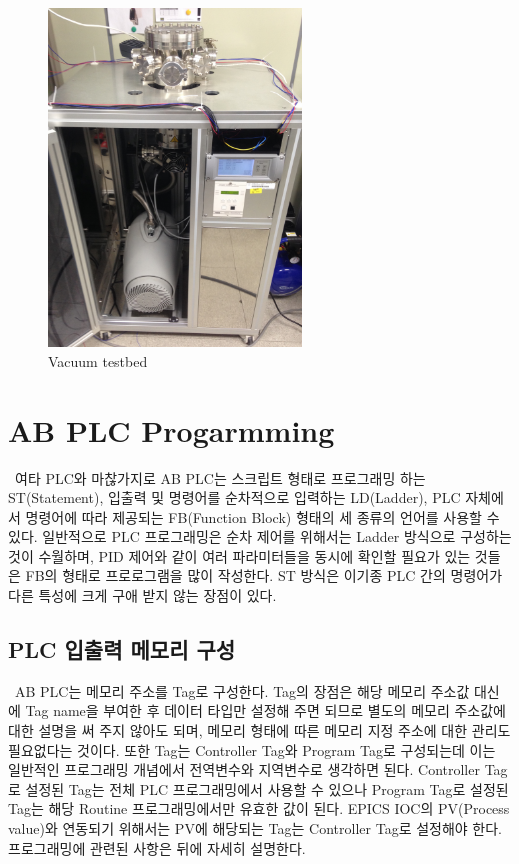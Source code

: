 \documentclass[11pt
  , a4paper
  , article
  , oneside
]{memoir}
\begin{document}
\begin{figure}[!htb]
	\centering
	\includegraphics[width=0.6\textwidth]{./picture/vacuumsystem.JPG}
	\caption{
		Vacuum testbed
	}
	\label{fig:}
\end{figure}

\newpage

\chapter{AB PLC Progarmming}\
 여타 PLC와 마찮가지로 AB PLC는 스크립트 형태로 프로그래밍 하는 ST(Statement), 입출력 및 명령어를 순차적으로 입력하는 LD(Ladder), PLC 자체에서 명령어에 따라 제공되는 FB(Function Block) 형태의 세 종류의 언어를 사용할 수 있다. 일반적으로 PLC 프로그래밍은 순차 제어를 위해서는 Ladder 방식으로 구성하는 것이 수월하며, PID 제어와 같이 여러 파라미터들을 동시에 확인할 필요가 있는 것들은 FB의 형태로 프로로그램을 많이 작성한다. ST 방식은 이기종 PLC 간의 명령어가 다른 특성에 크게 구애 받지 않는 장점이 있다. 

\section{PLC 입출력 메모리 구성}\
 AB PLC는 메모리 주소를 Tag로 구성한다. Tag의 장점은 해당 메모리 주소값 대신에 Tag name을 부여한 후 데이터 타입만 설정해 주면 되므로 별도의 메모리 주소값에 대한 설명을 써 주지 않아도 되며, 메모리 형태에 따른 메모리 지정 주소에 대한 관리도 필요없다는 것이다. 
 또한 Tag는 Controller Tag와 Program Tag로 구성되는데 이는 일반적인 프로그래밍 개념에서 전역변수와 지역변수로 생각하면 된다. Controller Tag로 설정된 Tag는 전체 PLC 프로그래밍에서 사용할 수 있으나 Program Tag로 설정된 Tag는 해당 Routine 프로그래밍에서만 유효한 값이 된다. EPICS IOC의 PV(Process value)와 연동되기 위해서는 PV에 해당되는 Tag는 Controller Tag로 설정해야 한다. 프로그래밍에 관련된 사항은 뒤에 자세히 설명한다.\
 
\end{document}
